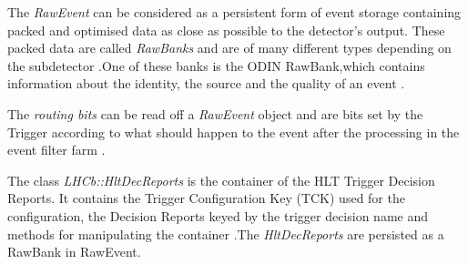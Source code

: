 The \textit{RawEvent} can be considered as a persistent form of event storage containing packed and optimised data as close as possible to the detector's output. These packed data are called \textit{RawBanks} and are of many different types depending on the subdetector \cite{rawEv}.One of these banks is the ODIN RawBank,which contains information about the identity, the source and the quality of an event \cite{odin}.\par
The \textit{routing bits} can be read off a \textit{RawEvent} object and are bits set by the Trigger according to what should happen to the event after the processing in the event filter farm \cite{hlteff}.\par
The class \textit{LHCb::HltDecReports} is the container of the HLT Trigger Decision Reports. It contains the Trigger Configuration Key (TCK) used for the configuration, the Decision Reports keyed by the trigger decision name and methods for manipulating the container \cite{hltdec}.The \textit{HltDecReports} are persisted as a RawBank in RawEvent.\par

